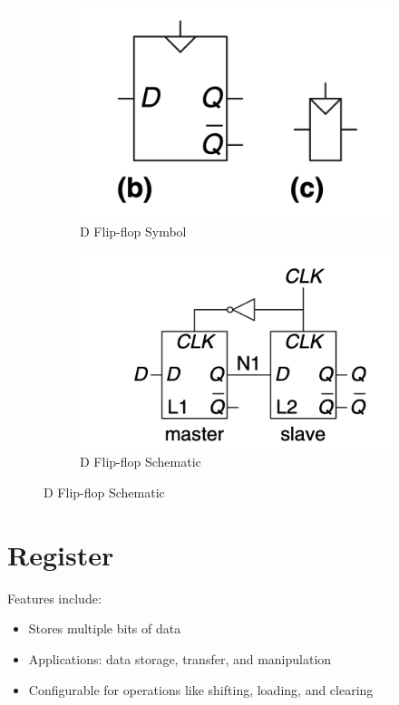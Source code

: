 \documentclass[12pt]{report}
\begin{document}
\begin{figure}[H]
    \centering
    \begin{subfigure}{0.45\textwidth}
        \centering
        \includegraphics[width=\textwidth]{D-flip-flop_symbol.png}
        \caption{D Flip-flop Symbol}
    \end{subfigure}
    \hfill
    \begin{subfigure}{0.45\textwidth}
        \centering
        \includegraphics[width=\textwidth]{D_flip-flop_schematic.png}
        \caption{D Flip-flop Schematic}
    \end{subfigure}
\end{figure}

\section{Register}
 Features include:
\begin{itemize}
    \item Stores multiple bits of data
    \item Applications: data storage, transfer, and manipulation
    \item Configurable for operations like shifting, loading, and clearing
\end{itemize}
\end{document}
